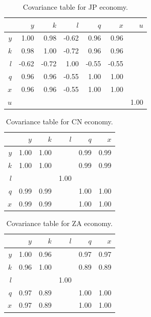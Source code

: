\documentclass[preprint,authoryear,12pt]{elsarticle}\usepackage{graphicx, color}
\begin{document}
\begin{table}[H]
\begin{center}
\caption{Covariance table for  JP economy.}
\label{tab:Covariance_JP}
\begin{tabular}{rrrrrrr}
  \hline
 & $y$ & $k$ & $l$ & $q$ & $x$ & $u$ \\ 
  \hline
$y$ & 1.00 & 0.98 & -0.62 & 0.96 & 0.96 &  \\ 
  $k$ & 0.98 & 1.00 & -0.72 & 0.96 & 0.96 &  \\ 
  $l$ & -0.62 & -0.72 & 1.00 & -0.55 & -0.55 &  \\ 
  $q$ & 0.96 & 0.96 & -0.55 & 1.00 & 1.00 &  \\ 
  $x$ & 0.96 & 0.96 & -0.55 & 1.00 & 1.00 &  \\ 
  $u$ &  &  &  &  &  & 1.00 \\ 
   \hline
\end{tabular}
\end{center}
\end{table}



\begin{table}[H]
\begin{center}
\caption{Covariance table for  CN economy.}
\label{tab:Covariance_CN}
\begin{tabular}{rrrrrr}
  \hline
 & $y$ & $k$ & $l$ & $q$ & $x$ \\ 
  \hline
$y$ & 1.00 & 1.00 &  & 0.99 & 0.99 \\ 
  $k$ & 1.00 & 1.00 &  & 0.99 & 0.99 \\ 
  $l$ &  &  & 1.00 &  &  \\ 
  $q$ & 0.99 & 0.99 &  & 1.00 & 1.00 \\ 
  $x$ & 0.99 & 0.99 &  & 1.00 & 1.00 \\ 
   \hline
\end{tabular}
\end{center}
\end{table}



\begin{table}[H]
\begin{center}
\caption{Covariance table for  ZA economy.}
\label{tab:Covariance_ZA}
\begin{tabular}{rrrrrr}
  \hline
 & $y$ & $k$ & $l$ & $q$ & $x$ \\ 
  \hline
$y$ & 1.00 & 0.96 &  & 0.97 & 0.97 \\ 
  $k$ & 0.96 & 1.00 &  & 0.89 & 0.89 \\ 
  $l$ &  &  & 1.00 &  &  \\ 
  $q$ & 0.97 & 0.89 &  & 1.00 & 1.00 \\ 
  $x$ & 0.97 & 0.89 &  & 1.00 & 1.00 \\ 
   \hline
\end{tabular}
\end{center}
\end{table}
\end{document}
